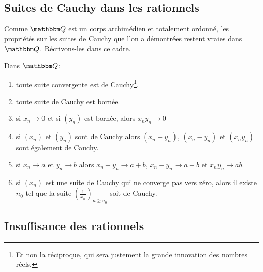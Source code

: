 \subsection{Suites de Cauchy dans les rationnels}
Comme \( \eQ \) est un corps archimédien et totalement ordonné, les propriétés sur les suites de Cauchy que l'on a démontrées restent vraies dans \( \eQ\). Récrivons-les dans ce cadre.
\begin{proposition}        \label{PropFFDJooAapQlP}
  Dans \( \eQ \):
    \begin{enumerate}
        \item       \label{ItemRKCIooJguHdji}
            toute suite convergente est de Cauchy\footnote{Et non la réciproque, qui sera justement la grande innovation des nombres réels.}.
        \item       \label{ItemRKCIooJguHdjii}
            toute suite de Cauchy est bornée.
        \item       \label{ItemRKCIooJguHdjiii}
            si \( x_n\to 0\) et si \( (y_n)\) est bornée, alors \( x_ny_n\to 0\)
        \item
            si \( (x_n)\) et \( (y_n)\) sont de Cauchy alors \( (x_n+y_n)\), \( (x_n-y_n)\) et \( (x_ny_n)\) sont également de Cauchy.
        \item       \label{ITEMooIAFSooAIUpAN}
            si \( x_n\to a \) et \( y_n\to b \) alors \( x_n+y_n\to a+b\), \( x_n-y_n\to a-b\) et \(  x_ny_n\to ab  \).
        \item   \label{ItemRKCIooJguHdjvi}
           si \( (x_n)\) est une suite de Cauchy qui ne converge pas vers zéro, alors il existe \( n_0\) tel que la suite \( \left( \frac{1}{ x_n } \right)_{n\geq n_0}\) soit de Cauchy.
    \end{enumerate}
\end{proposition}


\subsection{Insuffisance des rationnels}


